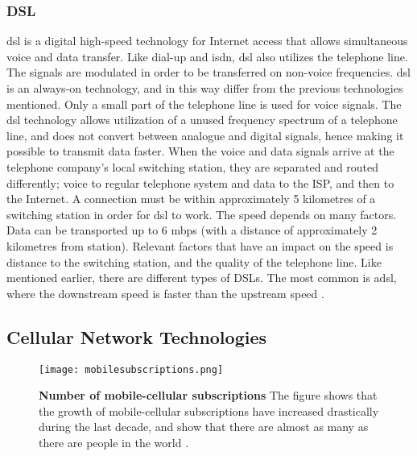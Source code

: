 \subsubsection{DSL}
\gls{dsl} is a digital high-speed technology for Internet access that allows simultaneous voice and data transfer. Like dial-up and \gls{isdn}, \gls{dsl} also utilizes the telephone line. The signals are modulated in order to be transferred on non-voice frequencies. \gls{dsl} is an always-on technology, and in this way differ from the previous technologies mentioned. Only a small part of the telephone line is used for voice signals. The \gls{dsl} technology allows utilization of a unused frequency spectrum of a telephone line, and does not convert between analogue and digital signals, hence making it possible to transmit data faster. When the voice and data signals arrive at the telephone company's local switching station, they are separated and routed differently; voice to regular telephone system and data to the ISP, and then to the Internet. A connection must be within approximately 5 kilometres of a  switching station in order for \gls{dsl} to work. The speed depends on many factors. Data can be transported up to 6 \gls{mbps} (with a distance of approximately 2 kilometres from station). Relevant factors that have an impact on the speed is distance to the switching station, and the quality of the telephone line. Like mentioned earlier, there are different types of DSLs. The most common is \gls{adsl}, where the downstream speed is faster than the upstream speed \cite{differentuplinks}.



\subsection{Cellular Network Technologies}

\begin{figure}[t]
  \centering
      \texttt{[image: mobilesubscriptions.png]}
  \caption [Number of mobile-cellular subscriptions]{\textbf{Number of mobile-cellular subscriptions} The figure shows that the growth of mobile-cellular subscriptions have increased drastically during the last decade, and show that there are almost as many as there are people in the world \cite{itu2013}.}
  \label{fig:subscribers}
\end{figure}

